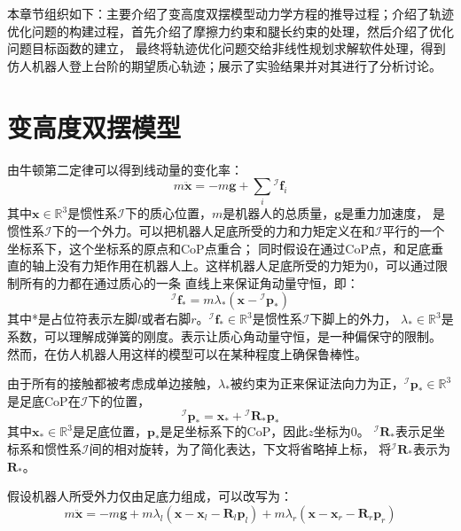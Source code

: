 本章节组织如下：主要介绍了变高度双摆模型动力学方程的推导过程；介绍了轨迹优化问题的构建过程，首先介绍了摩擦力约束和腿长约束的处理，然后介绍了优化问题目标函数的建立，
最终将轨迹优化问题交给非线性规划求解软件处理，得到仿人机器人登上台阶的期望质心轨迹；展示了实验结果并对其进行了分析讨论。
\section{变高度双摆模型}
\label{vari_height_pendu}
由牛顿第二定律可以得到线动量的变化率：
\begin{equation}
    \label{equ:newton_2}
    m \ddot{\boldsymbol{x}}=-m \boldsymbol{g}+\sum_i{ }^{\mathcal{I}} \boldsymbol{f}_i
\end{equation}
其中$\boldsymbol{x} \in \mathbb{R}^{3}$是惯性系$\mathcal{I}$下的质心位置，$m$是机器人的总质量，$\boldsymbol{g}$是重力加速度， 
是惯性系$\mathcal{I}$下的一个外力。可以把机器人足底所受的力和力矩定义在和$\mathcal{I}$平行的一个坐标系下，这个坐标系的原点和CoP点重合；
同时假设在通过CoP点，和足底垂直的轴上没有力矩作用在机器人上。这样机器人足底所受的力矩为0，可以通过限制所有的力都在通过质心的一条
直线上来保证角动量守恒，即：
\begin{equation}
    \label{equ:linear_f}
    { }^{\mathcal{I}} \boldsymbol{f}_*=m \lambda_*\left(\boldsymbol{x}-{ }^{\mathcal{I}} \boldsymbol{p}_*\right)
\end{equation}
其中*是占位符表示左脚$l$或者右脚$r$。${ }^{\mathcal{I}} \boldsymbol{f}_* \in \mathbb{R}^{3}$是惯性系$\mathcal{I}$下脚上的外力，
$\lambda_* \in \mathbb{R}^{3}$是系数，可以理解成弹簧的刚度。表示让质心角动量守恒，是一种偏保守的限制。
然而，在仿人机器人用这样的模型可以在某种程度上确保鲁棒性。

由于所有的接触都被考虑成单边接触，$\lambda_*$被约束为正来保证法向力为正，${ }^{\mathcal{I}} \boldsymbol{p}_* \in \mathbb{R}^{3}$
是足底CoP在$\mathcal{I}$下的位置，
\begin{equation}
    \label{equ:cop}
    { }^{\mathcal{I}} \boldsymbol{p}_*=\boldsymbol{x}_*+{ }^{\mathcal{I}} \boldsymbol{R}_* \boldsymbol{p}_*
\end{equation}
其中$\boldsymbol{x}_* \in \mathbb{R}^{3}$是足底位置，$\boldsymbol{p}_*$是足坐标系下的CoP，因此$z$坐标为0。
${ }^{\mathcal{I}} \boldsymbol{R}_*$表示足坐标系和惯性系$\mathcal{I}$间的相对旋转，为了简化表达，下文将省略掉上标，
将${ }^{\mathcal{I}} \boldsymbol{R}_*$表示为$\boldsymbol{R}_*$。

假设机器人所受外力仅由足底力组成，可以改写为：
\begin{equation}
    \label{equ:newton_linear_1}
    m \ddot{\boldsymbol{x}}= -m \boldsymbol{g}+m \lambda_l\left(\boldsymbol{x}-\boldsymbol{x}_l-\boldsymbol{R}_l \boldsymbol{p}_l\right)
    +m \lambda_r\left(\boldsymbol{x}-\boldsymbol{x}_r-\boldsymbol{R}_r \boldsymbol{p}_r\right)
\end{equation}

